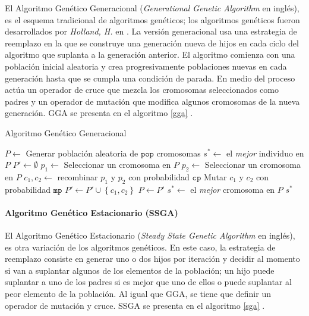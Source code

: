 El Algoritmo Genético Generacional (\emph{Generational Genetic Algorithm} en inglés), es el esquema tradicional de algoritmos genéticos; los algoritmos genéticos fueron desarrollados por \emph{Holland, H.} en \cite{holland1975adaptation}. La versión generacional usa una estrategia de reemplazo en la que se construye una generación nueva de hijos en cada ciclo del algoritmo que suplanta a la generación anterior. El algoritmo comienza con una población inicial aleatoria y crea progresivamente poblaciones nuevas en cada generación hasta que se cumpla una condición de parada. En medio del proceso actúa un operador de cruce que mezcla los cromosomas seleccionados como padres y un operador de mutación que modifica algunos cromosomas de la nueva generación. GGA se presenta en el algoritmo \ref{gga} \cite{flores2014metaheuristics}.

\begin{algorithm}
\caption{Algoritmo Genético Generacional}
\label{gga}
\begin{algorithmic}[1]


\State $P \gets$ Generar población aleatoria de $\texttt{pop}$ cromosomas
\State $s^* \gets $ el \emph{mejor} individuo en $P$
	\State $P' \gets \emptyset$
		\State $p_1 \gets$ Seleccionar un cromosoma en $P$
		\State $p_2 \gets$ Seleccionar un cromosoma en $P$
		\State $c_1, c_2 \gets $ recombinar $p_1$ y $p_2$ con probabilidad $\texttt{cp}$
		\State Mutar $c_1$ y $c_2$ con probabilidad $\texttt{mp}$
		\State $P' \gets P' \cup \left\lbrace c_1, c_2 \right\rbrace$
	\EndWhile
	\State $P \gets P'$
		\State $s^* \gets$ el \emph{mejor} cromosoma en $P$
	\EndIf
\EndWhile
\State \Return $s^*$

\end{algorithmic}
\end{algorithm}

\paragraph{Algoritmo Genético Estacionario (SSGA)}

El Algoritmo Genético Estacionario (\emph{Steady State Genetic Algorithm} en inglés), es otra variación de los algoritmos genéticos. En este caso, la estrategia de reemplazo consiste en generar uno o dos hijos por iteración y decidir al momento si van a suplantar algunos de los elementos de la población; un hijo puede suplantar a uno de los padres si es mejor que uno de ellos o puede suplantar al peor elemento de la población. Al igual que GGA, se tiene que definir un operador de mutación y cruce. SSGA se presenta en el algoritmo \ref{sga} \cite{flores2014metaheuristics}.

